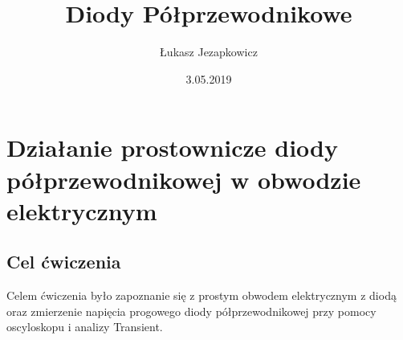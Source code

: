 \documentclass[11pt]{article}
\author{Łukasz Jezapkowicz}
\title{Diody Półprzewodnikowe}
\date{3.05.2019}
\begin{document}
\maketitle
\tableofcontents \newpage
\section{Działanie prostownicze diody półprzewodnikowej w obwodzie elektrycznym}
\subsection{Cel ćwiczenia}
Celem ćwiczenia było zapoznanie się z prostym obwodem elektrycznym z diodą oraz zmierzenie napięcia progowego diody półprzewodnikowej przy pomocy oscyloskopu i analizy Transient.
\end{document}
